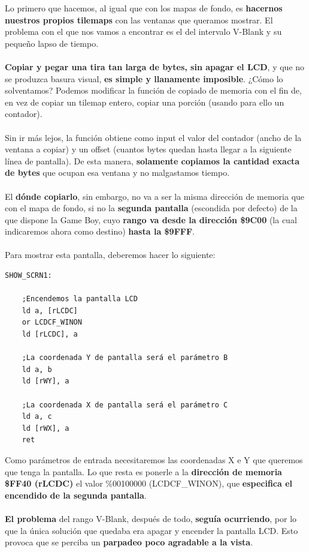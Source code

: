 Lo primero que hacemos, al igual que con los mapas de fondo, es \textbf{hacernos nuestros propios tilemaps} con las ventanas que queramos mostrar. El problema con el que nos vamos a encontrar es el del intervalo V-Blank y su pequeño lapso de tiempo.
\\ \\
\textbf{Copiar y pegar una tira tan larga de bytes, sin apagar el LCD}, y que no se produzca basura visual, \textbf{es simple y llanamente imposible}. ¿Cómo lo solventamos? Podemos modificar la función de copiado de memoria con el fin de, en vez de copiar un tilemap entero, copiar una porción (usando para ello un contador).
\\ \\
Sin ir más lejos, la función obtiene como input el valor del contador (ancho de la ventana a copiar) y un offset (cuantos bytes quedan hasta llegar a la siguiente línea de pantalla). De esta manera, \textbf{solamente copiamos la cantidad exacta de bytes} que ocupan esa ventana y no malgastamos tiempo.
\\ \\
El \textbf{dónde copiarlo}, sin embargo, no va a ser la misma dirección de memoria que con el mapa de fondo, si no la \textbf{segunda pantalla} (escondida por defecto) de la que dispone la Game Boy, cuyo \textbf{rango va desde la dirección \$9C00} (la cual indicaremos ahora como destino) \textbf{hasta la \$9FFF}.
\\ \\
Para mostrar esta pantalla, deberemos hacer lo siguiente:

\begin{lstlisting}[caption={Encendido de la Segunda Pantalla}, label={code:show_screen}]
SHOW_SCRN1:

	;Encendemos la pantalla LCD
	ld a, [rLCDC]
	or LCDCF_WINON
	ld [rLCDC], a
	
	;La coordenada Y de pantalla será el parámetro B
	ld a, b
	ld [rWY], a

	;La coordenada X de pantalla será el parámetro C
	ld a, c
	ld [rWX], a
	ret
\end{lstlisting}

Como parámetros de entrada necesitaremos las coordenadas X e Y que queremos que tenga la pantalla. Lo que resta es ponerle a la \textbf{dirección de memoria \$FF40 (rLCDC)} el valor \%00100000 (LCDCF\_WINON), que \textbf{especifica el encendido de la segunda pantalla}.
\\ \\
\textbf{El problema} del rango V-Blank, después de todo, \textbf{seguía ocurriendo}, por lo que la única solución que quedaba era apagar y encender la pantalla LCD. Esto provoca que se perciba un \textbf{parpadeo poco agradable a la vista}.

